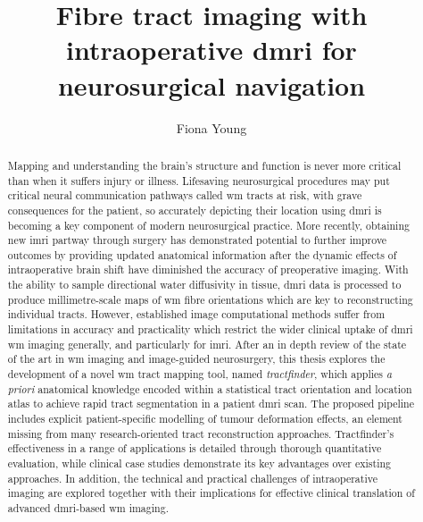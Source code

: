 
\title{ Fibre tract imaging with intraoperative \gls{dmri} for neurosurgical navigation }
\author{ Fiona Young }

\maketitle
\makedeclaration

\begin{abstract} %
Mapping and understanding the brain's structure and function is never more critical than when it suffers injury or illness.
Lifesaving neurosurgical procedures may put critical neural communication pathways called \gls{wm} tracts at risk, with grave consequences for the patient, so accurately depicting their location using \gls{dmri} is becoming a key component of modern neurosurgical practice.
More recently, obtaining new \gls{imri} partway through surgery has demonstrated potential to further improve outcomes by providing updated anatomical information after the dynamic effects of intraoperative brain shift have diminished the accuracy of preoperative imaging.
With the ability to sample directional water diffusivity in tissue, \gls{dmri} data is processed to produce millimetre-scale maps of \gls{wm} fibre orientations which are key to reconstructing individual tracts.
However, established image computational methods suffer from limitations in accuracy and practicality which restrict the wider clinical uptake of \gls{dmri} \gls{wm} imaging generally, and particularly for \gls{imri}.
After an in depth review of the state of the art in \gls{wm} imaging and image-guided neurosurgery, this thesis explores the development of a novel \gls{wm} tract mapping tool, named \textit{tractfinder}, which applies \textit{a priori} anatomical knowledge encoded within a statistical tract orientation and location atlas to achieve rapid tract segmentation in a patient \gls{dmri} scan.
The proposed pipeline includes explicit patient-specific modelling of tumour deformation effects, an element missing from many research-oriented tract reconstruction approaches.
Tractfinder's effectiveness in a range of applications is detailed through thorough quantitative evaluation, while clinical case studies demonstrate its key advantages over existing approaches.
In addition, the technical and practical challenges of intraoperative imaging are explored together with their implications for effective clinical translation of advanced \gls{dmri}-based \gls{wm} imaging.
\end{abstract}

